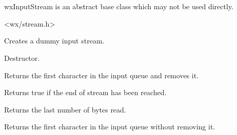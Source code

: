 \section{}\label{wxinputstream}

wxInputStream is an abstract base class which may not be used directly.




<wx/stream.h>




Creates a dummy input stream.



Destructor.



Returns the first character in the input queue and removes it.

\label{wxinputstreameof}


Returns true if the end of stream has been reached.

\label{wxinputstreamlastread}


Returns the last number of bytes read.



Returns the first character in the input queue without removing it.



